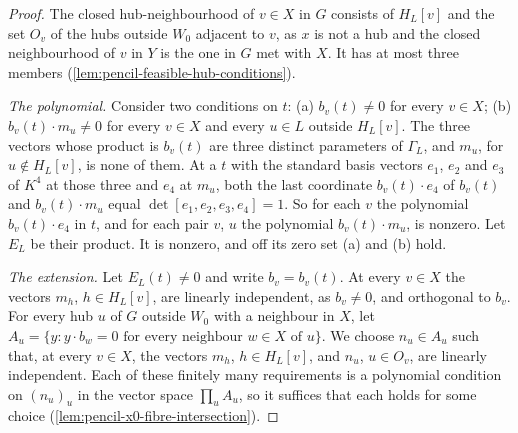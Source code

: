 \begin{proof}
  \leanok
  The closed hub-neighbourhood of $v \in X$ in $G$ consists of $H_L[v]$
  and the set $O_v$ of the hubs outside $W_0$ adjacent to $v$, as $x$ is
  not a hub and the closed neighbourhood of $v$ in $Y$ is the one in $G$
  met with $X$. It has at most three members
  (\cref{lem:pencil-feasible-hub-conditions}).

  \emph{The polynomial.} Consider two conditions on $t$: (a)
  $b_v(t) \ne 0$ for every $v \in X$; (b) $b_v(t) \cdot m_u \ne 0$ for
  every $v \in X$ and every $u \in L$ outside $H_L[v]$. The three vectors
  whose product is $b_v(t)$ are three distinct parameters of $\Gamma_L$,
  and $m_u$, for $u \notin H_L[v]$, is none of them. At a $t$ with the
  standard basis vectors $e_1$, $e_2$ and $e_3$ of $K^4$ at those three
  and $e_4$ at $m_u$, both the last coordinate $b_v(t) \cdot e_4$ of
  $b_v(t)$ and $b_v(t) \cdot m_u$ equal $\det[e_1, e_2, e_3, e_4] = 1$.
  So for each $v$ the polynomial $b_v(t) \cdot e_4$ in $t$, and for each
  pair $v$, $u$ the polynomial $b_v(t) \cdot m_u$, is nonzero. Let $E_L$
  be their product. It is nonzero, and off its zero set (a) and (b) hold.

  \emph{The extension.} Let $E_L(t) \ne 0$ and write $b_v = b_v(t)$. At
  every $v \in X$ the vectors $m_h$, $h \in H_L[v]$, are linearly
  independent, as $b_v \ne 0$, and orthogonal to $b_v$. For every hub $u$
  of $G$ outside $W_0$ with a neighbour in $X$, let
  $A_u = \{y : y \cdot b_w = 0 \text{ for every neighbour } w \in X
  \text{ of } u\}$. We choose $n_u \in A_u$ such that, at every
  $v \in X$, the vectors $m_h$, $h \in H_L[v]$, and $n_u$, $u \in O_v$,
  are linearly independent. Each of these finitely many requirements is a
  polynomial condition on $(n_u)_u$ in the vector space $\prod_u A_u$, so
  it suffices that each holds for some choice
  (\cref{lem:pencil-x0-fibre-intersection}).


\end{proof}
